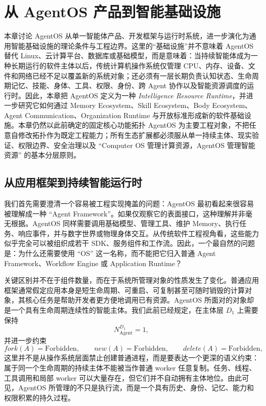 \chapter{从 AgentOS 产品到智能基础设施}

\begin{chapterlead}
本章讨论 AgentOS 从单一智能体产品、开发框架与运行时系统，进一步演化为通用智能基础设施的理论条件与工程边界。这里的“基础设施”并不意味着 AgentOS 替代 Linux、云计算平台、数据库或基础模型，而是意味着：当持续智能体成为一种长期运行的软件主体以后，传统计算机操作系统仅管理 CPU、内存、设备、文件和网络已经不足以覆盖新的系统对象；还必须有一层长期负责认知状态、生命周期记忆、技能、身体、工具、权限、身份、跨 Agent 协作以及智能资源调度的运行时。因此，本章把 AgentOS 定义为一种 \emph{Intelligence Resource Runtime}，并进一步研究它如何通过 Memory Ecosystem、Skill Ecosystem、Body Ecosystem、Agent Communication、Organization Runtime 与开放标准形成新的软件基础设施。本章仍然以此前确定的固定核心功能拓扑 AgentOS 为主要工程对象，不把任意自修改拓扑作为既定工程能力；所有生态扩展都必须服从单一持续主体、现实验证、权限边界、安全治理以及 ``Computer OS 管理计算资源，AgentOS 管理智能资源'' 的基本分层原则。
\end{chapterlead}


\section{从应用框架到持续智能运行时}

我们首先需要澄清一个容易被工程实现掩盖的问题：AgentOS 最初看起来很容易被理解成一种 ``Agent Framework''。如果仅观察它的表面接口，这种理解并非毫无根据。AgentOS 同样需要调用基础模型、管理工具、维护 Memory、执行任务、响应事件，并与数字世界或物理身体交互。从传统软件工程视角看，这些能力似乎完全可以被组织成若干 SDK、服务组件和工作流。因此，一个最自然的问题是：为什么还需要使用 ``OS'' 这一名称，而不能把它归入普通 Agent Framework、Workflow Engine 或 Application Runtime？

关键区别并不在于组件数量，而在于系统所管理对象的性质发生了变化。普通应用框架通常假定应用本身是短生命周期、可重启、可复制甚至可随时销毁的计算对象，其核心任务是帮助开发者更方便地调用已有资源。AgentOS 所面对的对象却是一个具有生命周期连续性的智能主体。我们此前已经规定，在主体层 $D_1$ 上需要保持
\[
N_{\mathrm{Agent}}^{D_1}=1,
\]
并进一步约束
\[
fork(A)=\mathrm{Forbidden},\qquad
new(A)=\mathrm{Forbidden},\qquad
delete(A)=\mathrm{Forbidden},
\]
这里并不是从操作系统层面禁止创建普通进程，而是要表达一个更深的语义约束：属于同一个生命周期的持续主体不能被当作普通 worker 任意复制。任务、线程、工具调用和局部 worker 可以大量存在，但它们并不自动拥有主体地位。由此可见，AgentOS 所管理的不只是执行流，而是一个具有历史、身份、记忆、能力和权限积累的持久过程。

